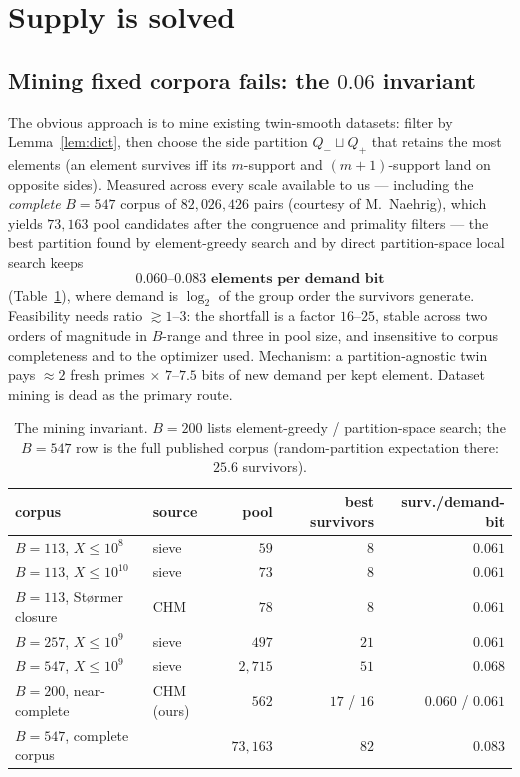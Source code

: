 \documentclass[11pt]{article}
\theoremstyle{remark}
\begin{document}
\section{Supply is solved}\label{sec:supply}

\subsection{Mining fixed corpora fails: the $0.06$ invariant}

The obvious approach is to mine existing twin-smooth datasets: filter by
Lemma~\ref{lem:dict}, then choose the side partition $Q_- \sqcup Q_+$ that
retains the most elements (an element survives iff its $m$-support and
$(m+1)$-support land on opposite sides). Measured across every scale
available to us --- including the \emph{complete} $B = 547$ corpus of
$82{,}026{,}426$ pairs (courtesy of M.~Naehrig), which yields $73{,}163$
pool candidates after the congruence and primality filters --- the best
partition found by element-greedy search and by direct partition-space
local search keeps
\[
\textbf{$0.060$--$0.083$ elements per demand bit}
\]
(Table~\ref{tab:invariant}), where demand is $\log_2$ of the group order
the survivors generate. Feasibility needs ratio $\gtrsim 1$--$3$: the
shortfall is a factor $16$--$25$, stable across two orders of magnitude in
$B$-range and three in pool size, and insensitive to corpus completeness
and to the optimizer used. Mechanism: a partition-agnostic twin pays
$\approx 2$ fresh primes $\times$ $7$--$7.5$ bits of new demand per kept
element. Dataset mining is dead as the primary route.

\begin{table}[ht]\centering\small
\begin{tabular}{@{}llrrr@{}}
\toprule
corpus & source & pool & best survivors & surv./demand-bit \\
\midrule
$B=113$, $X \le 10^8$ & sieve & $59$ & $8$ & $0.061$ \\
$B=113$, $X \le 10^{10}$ & sieve & $73$ & $8$ & $0.061$ \\
$B=113$, St\o rmer closure & CHM & $78$ & $8$ & $0.061$ \\
$B=257$, $X \le 10^9$ & sieve & $497$ & $21$ & $0.061$ \\
$B=547$, $X \le 10^9$ & sieve & $2{,}715$ & $51$ & $0.068$ \\
$B=200$, near-complete & CHM (ours) & $562$ & $17$ / $16$ & $0.060$ / $0.061$ \\
$B=547$, complete corpus & \cite{BCCEMNS23} & $73{,}163$ & $82$ & $0.083$ \\
\bottomrule
\end{tabular}
\caption{The mining invariant. $B=200$ lists element-greedy /
partition-space search; the $B=547$ row is the full published corpus
(random-partition expectation there: $25.6$ survivors).}
\label{tab:invariant}
\end{table}
\end{document}
